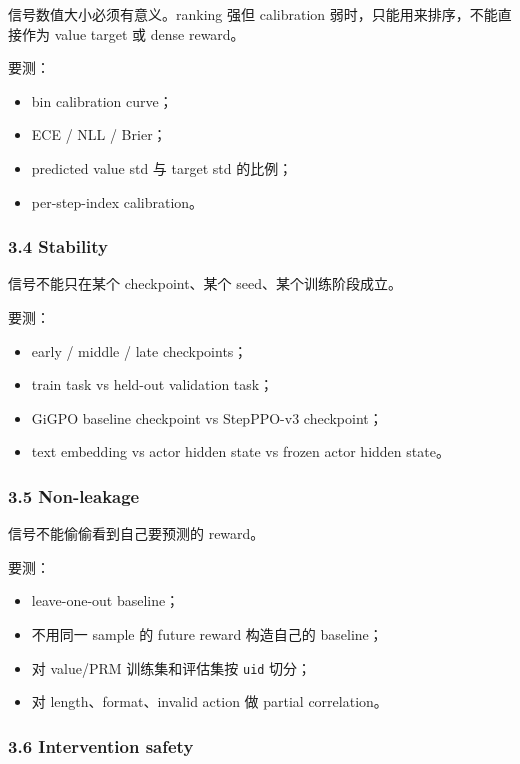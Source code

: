 \documentclass[
  10pt,
]{ctexart}
\providecommand{\tightlist}{%
  \setlength{\itemsep}{0pt}\setlength{\parskip}{0pt}}
\begin{document}
信号数值大小必须有意义。ranking 强但 calibration
弱时，只能用来排序，不能直接作为 value target 或 dense reward。

要测：

\begin{itemize}
\tightlist
\item
  bin calibration curve；
\item
  ECE / NLL / Brier；
\item
  predicted value std 与 target std 的比例；
\item
  per-step-index calibration。
\end{itemize}

\subsubsection{3.4 Stability}\label{stability}

信号不能只在某个 checkpoint、某个 seed、某个训练阶段成立。

要测：

\begin{itemize}
\tightlist
\item
  early / middle / late checkpoints；
\item
  train task vs held-out validation task；
\item
  GiGPO baseline checkpoint vs StepPPO-v3 checkpoint；
\item
  text embedding vs actor hidden state vs frozen actor hidden state。
\end{itemize}

\subsubsection{3.5 Non-leakage}\label{non-leakage}

信号不能偷偷看到自己要预测的 reward。

要测：

\begin{itemize}
\tightlist
\item
  leave-one-out baseline；
\item
  不用同一 sample 的 future reward 构造自己的 baseline；
\item
  对 value/PRM 训练集和评估集按 \texttt{uid} 切分；
\item
  对 length、format、invalid action 做 partial correlation。
\end{itemize}

\subsubsection{3.6 Intervention safety}\label{intervention-safety}
\end{document}
